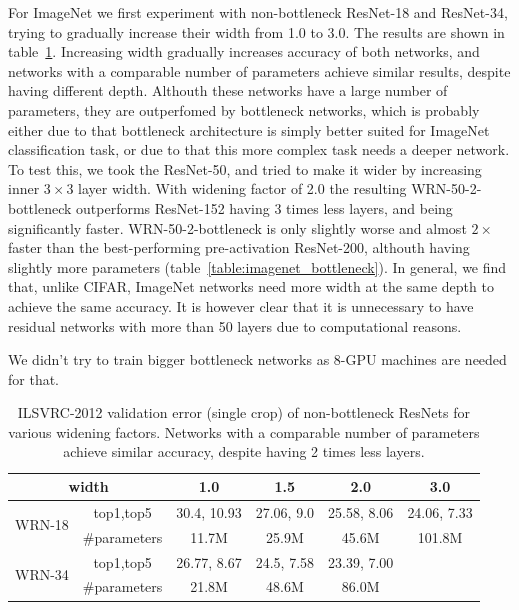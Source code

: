 \documentclass{bmvc2k}
\begin{document}
For ImageNet we first experiment with non-bottleneck ResNet-18 and ResNet-34, trying to gradually increase their width from 1.0 to 3.0. The results are shown in table~\ref{table:imagenet_non_bottleneck}. Increasing width gradually increases accuracy of both networks, and networks with a comparable number of parameters achieve similar results, despite having different depth. Althouth these networks have a large number of parameters, they are outperfomed by bottleneck networks, which is probably either due to that  bottleneck architecture is simply better suited for ImageNet classification task, or due to that this more complex task needs a deeper network. To test this, we took the ResNet-50, and tried to make it wider by increasing inner $3\times3$ layer width. With widening factor of 2.0 the resulting WRN-50-2-bottleneck outperforms ResNet-152 having 3 times less layers, and being significantly faster. WRN-50-2-bottleneck is only slightly worse and almost $2\times$ faster than the best-performing pre-activation ResNet-200, althouth having slightly more parameters (table~\ref{table:imagenet_bottleneck}). In general, we find that, unlike CIFAR, ImageNet networks need more width at the same depth to achieve the same accuracy. It is however clear that it is unnecessary to have residual networks with more than 50 layers due to computational reasons.

We didn't try to train bigger bottleneck networks as 8-GPU machines are needed for that.

\begin{table}[ht]
  \centering\small
  \begin{tabular}{c|c|c|c|c|c}
    \hline
    \multicolumn{2}{c|}{width} & 1.0 & 1.5 & 2.0 & 3.0 \\ \hline
    \multirow{2}{*}{WRN-18} & top1,top5 & 30.4, 10.93 & 27.06, 9.0 & 25.58, 8.06 & 24.06, 7.33 \\
    & \#parameters & 11.7M & 25.9M & 45.6M & 101.8M \\
    \hline
    \multirow{2}{*}{WRN-34} & top1,top5 & 26.77, 8.67 & 24.5, 7.58 & 23.39, 7.00 &  \\
    & \#parameters & 21.8M & 48.6M & 86.0M \\
    \hline
  \end{tabular}
  \caption{ILSVRC-2012 validation error (single crop) of non-bottleneck ResNets for various widening factors. Networks with a comparable number of parameters achieve similar accuracy, despite having 2 times less layers.}
  \label{table:imagenet_non_bottleneck}
\end{table}
\end{document}
